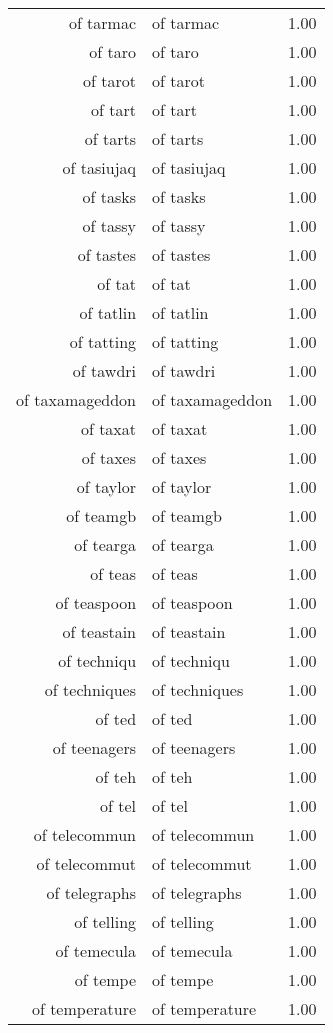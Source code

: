 \begin{table}[ht]
\begin{tabular}{rlr}
  of tarmac & of tarmac & 1.00 \\ 
  of taro & of taro & 1.00 \\ 
  of tarot & of tarot & 1.00 \\ 
  of tart & of tart & 1.00 \\ 
  of tarts & of tarts & 1.00 \\ 
  of tasiujaq & of tasiujaq & 1.00 \\ 
  of tasks & of tasks & 1.00 \\ 
  of tassy & of tassy & 1.00 \\ 
  of tastes & of tastes & 1.00 \\ 
  of tat & of tat & 1.00 \\ 
  of tatlin & of tatlin & 1.00 \\ 
  of tatting & of tatting & 1.00 \\ 
  of tawdri & of tawdri & 1.00 \\ 
  of taxamageddon & of taxamageddon & 1.00 \\ 
  of taxat & of taxat & 1.00 \\ 
  of taxes & of taxes & 1.00 \\ 
  of taylor & of taylor & 1.00 \\ 
  of teamgb & of teamgb & 1.00 \\ 
  of tearga & of tearga & 1.00 \\ 
  of teas & of teas & 1.00 \\ 
  of teaspoon & of teaspoon & 1.00 \\ 
  of teastain & of teastain & 1.00 \\ 
  of techniqu & of techniqu & 1.00 \\ 
  of techniques & of techniques & 1.00 \\ 
  of ted & of ted & 1.00 \\ 
  of teenagers & of teenagers & 1.00 \\ 
  of teh & of teh & 1.00 \\ 
  of tel & of tel & 1.00 \\ 
  of telecommun & of telecommun & 1.00 \\ 
  of telecommut & of telecommut & 1.00 \\ 
  of telegraphs & of telegraphs & 1.00 \\ 
  of telling & of telling & 1.00 \\ 
  of temecula & of temecula & 1.00 \\ 
  of tempe & of tempe & 1.00 \\ 
  of temperature & of temperature & 1.00 \\ 

\end{tabular}
\end{table}
